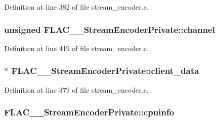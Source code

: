 Definition at line 382 of file stream\+\_\+encoder.\+c.

\subsubsection[{\texorpdfstring{channel}{channel}}]{\setlength{\rightskip}{0pt plus 5cm}unsigned F\+L\+A\+C\+\_\+\+\_\+\+Stream\+Encoder\+Private\+::channel}\hypertarget{struct_f_l_a_c_____stream_encoder_private_a98dbe004c38dab69d0625ae79f0e979e}{}\label{struct_f_l_a_c_____stream_encoder_private_a98dbe004c38dab69d0625ae79f0e979e}


Definition at line 419 of file stream\+\_\+encoder.\+c.

\subsubsection[{\texorpdfstring{client\+\_\+data}{client_data}}]{$\ast$ F\+L\+A\+C\+\_\+\+\_\+\+Stream\+Encoder\+Private\+::client\+\_\+data}\hypertarget{struct_f_l_a_c_____stream_encoder_private_a76da66f023007d374d0a87b61ccb24be}{}\label{struct_f_l_a_c_____stream_encoder_private_a76da66f023007d374d0a87b61ccb24be}


Definition at line 379 of file stream\+\_\+encoder.\+c.

\subsubsection[{\texorpdfstring{cpuinfo}{cpuinfo}}]{ F\+L\+A\+C\+\_\+\+\_\+\+Stream\+Encoder\+Private\+::cpuinfo}\hypertarget{struct_f_l_a_c_____stream_encoder_private_a7b943d5d0fe6204f16db8d875d651302}{}\label{struct_f_l_a_c_____stream_encoder_private_a7b943d5d0fe6204f16db8d875d651302}


